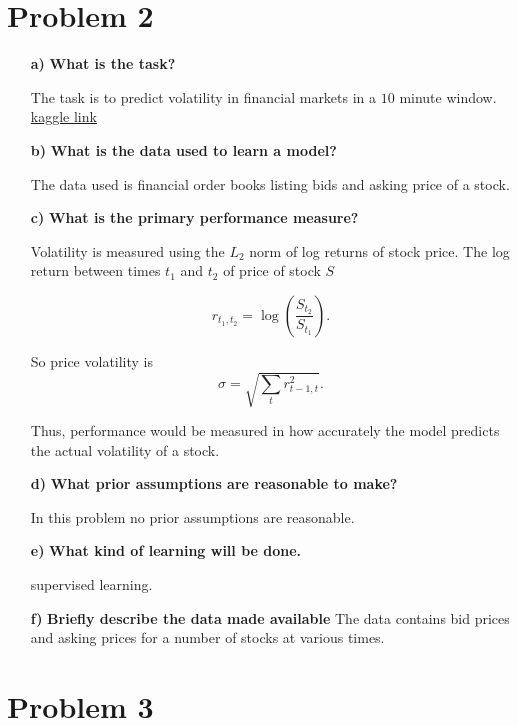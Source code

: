\section{Problem 2}%
\begin{itemize}
  \item[ \textbf{a)} ] \textbf{What is the task?} 
    \par The task is to predict volatility in financial markets in a $10$ 
    minute window.
    \href{https://www.kaggle.com/c/optiver-realized-volatility-prediction/overview/description}{kaggle
    link} 
  \item[ \textbf{b)} ] \textbf{What is the data used to learn a model?} 
    \par The data used is financial order books listing bids and asking price
    of a stock.
  \item[ \textbf{c)} ] \textbf{What is the primary performance measure?} 
    \par Volatility is measured using the $L_2$ norm of log returns of stock
    price. The log return between times $t_1$ and $t_2$ of price of stock $S$

    \[
      r_{t_1,t_2} = \log \left( \frac{S_{t_2}}{S_{t_1}} \right)
    .\] 

    So price volatility is
    \[
      \sigma = \sqrt{ \sum_{t} r_{t-1,t}^{2} }
    .\] 

    Thus, performance would be measured in how accurately the model predicts
    the actual volatility of a stock.
  \item[ \textbf{d)} ] \textbf{What prior assumptions are reasonable to make?} 
    \par In this problem no prior assumptions are reasonable.
  \item[ \textbf{e)} ] \textbf{What kind of learning will be done.} 
    \par supervised learning.
  \item[ \textbf{f)} ] \textbf{} \textbf{Briefly describe the data made
    available} 
    The data contains bid prices and asking prices for a number of
    stocks at various times.
\end{itemize}

\section{Problem 3}%

